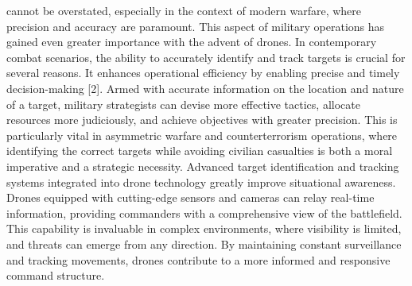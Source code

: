 \begin{multicols}{2}
cannot be overstated, especially in the context of modern warfare, where
precision and accuracy are paramount. This aspect of military operations
has gained even greater importance with the advent of drones. In
contemporary combat scenarios, the ability to accurately identify and
track targets is crucial for several reasons. It enhances operational
efficiency by enabling precise and timely decision-making {[}2{]}. Armed
with accurate information on the location and nature of a target,
military strategists can devise more effective tactics, allocate
resources more judiciously, and achieve objectives with greater
precision. This is particularly vital in asymmetric warfare and
counterterrorism operations, where identifying the correct targets while
avoiding civilian casualties is both a moral imperative and a strategic
necessity. Advanced target identification and tracking systems
integrated into drone technology greatly improve situational awareness.
Drones equipped with cutting-edge sensors and cameras can relay
real-time information, providing commanders with a comprehensive view of
the battlefield. This capability is invaluable in complex environments,
where visibility is limited, and threats can emerge from any direction.
By maintaining constant surveillance and tracking movements, drones
contribute to a more informed and responsive command structure.
\end{multicols}

